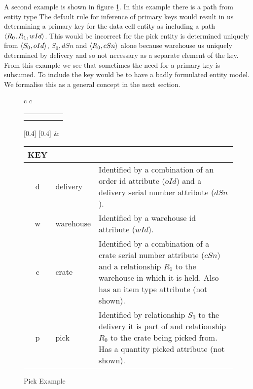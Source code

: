 \documentclass[10pt,a4paper]{article}
\begin{document}
A second example is shown in figure \ref{pickexample}. In this example there is a path 
from  entity type The default rule for inference of primary keys would result in us determining
a primary key for the data cell entity as including a path 
$\langle R_0,R_1,wId\rangle$. This would be incorrect for the pick entity 
is determined uniquely from 
$\langle S_0,oId\rangle$, $S_0,dSn$ and $\langle R_0,cSn\rangle$ alone because 
warehouse us uniquely determined by delivery and so not necessary as a separate 
element of the key. From this example we see that sometimes
the need for a primary key is subsumed. To include the key would be to 
have a badly formulated entity model. We formalise this as a general concept in the next section.
\begin{figure} [h]
\begin{center}
\begin{tabular}{c c}
\begin{tabular}{cp{0.75cm}cp{0.75cm}c}
   \Rnode{d}{d}    & & \Rnode{w}{w}   & & \Rnode{v}{v}\\[1.2cm]     
	 \Rnode{p}{p}  & & \Rnode{c}{c} & &               
\end{tabular}
[0.4]
\idcomp
{}
[0.4]
\idcomp
{} 
\idcomp
{} 
\idcomp
{}
\idcomp
{}
\idcomp
{}
\idcomp
& \footnotesize
\begin{tabular}{c p{1.5cm} p{4cm}}
KEY && \\
\hline
d & delivery & Identified by a combination of an order id attribute ($oId$) and a
delivery serial number  attribute ($dSn$). \\
w & warehouse & Identified by a warehouse id attribute ($wId$). \\
c & crate & Identified by a combination of a crate serial number attribute ($cSn$) and a relationship $R_1$ to the warehouse in which it is held.
             Also has an item type attribute (not shown).\\
p & pick & Identified by relationship $S_0$ to the delivery  it is part of and relationship $R_0$ to the crate being picked from. Has a quantity picked attribute (not shown). \\
\end{tabular} 
\end{tabular}
\end{center}
\caption{Pick Example}
\label{pickexample}
\end{figure}
\end{document}

